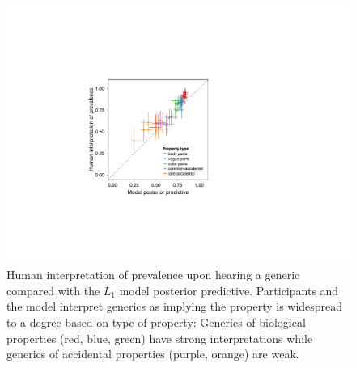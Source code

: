 \documentclass{pnastwo}
\begin{document}
\begin{article}
\begin{figure}
\centering
    \includegraphics[width=0.8\columnwidth]{implied-byItem-mh100kX2b.pdf}
    \caption{Human interpretation of prevalence upon hearing a generic compared with the $L_1$ model posterior predictive. 
    Participants and the model interpret generics as implying the property is widespread to a degree based on type of property: Generics of biological properties (red, blue, green) have  strong interpretations while generics of accidental properties (purple, orange) are weak.}
  \label{fig:impliedByItem}
\end{figure}


\end{article}
\end{document}
